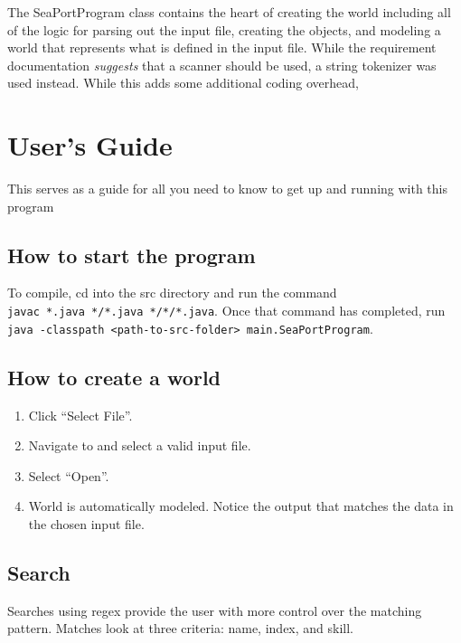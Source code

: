 \documentclass[english,floatsintext,man]{apa6}
\providecommand{\tightlist}{%
  \setlength{\itemsep}{0pt}\setlength{\parskip}{0pt}}
\begin{document}
The SeaPortProgram class contains the heart of creating the world
including all of the logic for parsing out the input file, creating the
objects, and modeling a world that represents what is defined in the
input file. While the requirement documentation \emph{suggests} that a
scanner should be used, a string tokenizer was used instead. While this
adds some additional coding overhead,

\section{User's Guide}\label{users-guide}

This serves as a guide for all you need to know to get up and running
with this program

\subsection{How to start the program}\label{how-to-start-the-program}

To compile, cd into the src directory and run the command
\texttt{javac\ *.java\ */*.java\ */*/*.java}. Once that command has
completed, run
\texttt{java\ -classpath\ \textless{}path-to-src-folder\textgreater{}\ main.SeaPortProgram}.

\subsection{How to create a world}\label{how-to-create-a-world}

\begin{enumerate}
\def\labelenumi{\arabic{enumi}.}
\tightlist
\item
  Click \enquote{Select File}.
\item
  Navigate to and select a valid input file.
\item
  Select \enquote{Open}.
\item
  World is automatically modeled. Notice the output that matches the
  data in the chosen input file.
\end{enumerate}

\subsection{Search}\label{search}

Searches using regex provide the user with more control over the
matching pattern. Matches look at three criteria: name, index, and
skill.
\end{document}
